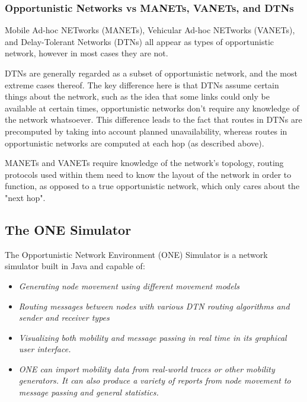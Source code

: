 \documentclass[12pt]{report}
\begin{document}
\subsubsection{Opportunistic Networks vs MANETs, VANETs, and DTNs}
Mobile Ad-hoc NETworks (MANETs), Vehicular Ad-hoc NETworks (VANETs), and Delay-Tolerant Networks (DTNs) all appear as types of opportunistic network, however in most cases they are not.

DTNs are generally regarded as a subset of opportunistic network, and the most extreme cases thereof\cite{ieeemag}.
The key difference here is that DTNs assume certain things about the network, such as the idea that some links could only be available at certain times, opportunistic networks don't require any knowledge of the network whatsoever.
This difference leads to the fact that routes in DTNs are precomputed by taking into account planned unavailability, whereas routes in opportunistic networks are computed at each hop (as described above).

\par

MANETs and VANETs require knowledge of the network's topology, routing protocols used within them need to know the layout of the network in order to function, as opposed to a true opportunistic network, which only cares about the "next hop".

\subsection{The ONE Simulator}

The Opportunistic Network Environment (ONE) Simulator is a network simulator built in Java and capable of:

\begin{center}
  \begin{itemize}
    \item \textit{Generating node movement using different movement models}
    \item \textit{Routing messages between nodes with various DTN routing algorithms and sender and receiver types}
    \item \textit{Visualizing both mobility and message passing in real time in its graphical user interface.}
    \item \textit{ONE can import mobility data from real-world traces or other mobility generators. It can also produce a variety of reports from node movement to message passing and general statistics.}\cite{onewebsite}
  \end{itemize}
\end{center}
\end{document}
